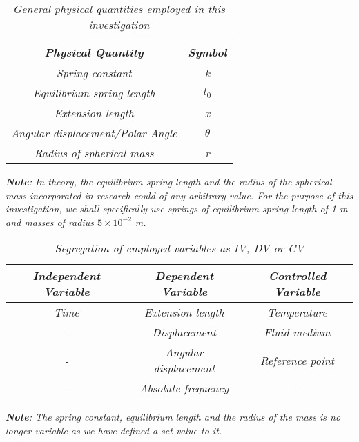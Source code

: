 \begin{table}[H]
    \centering
        \begin{tabular}{|c|c|}
        \hline
        \hline
        \textit{Physical Quantity} & \textit{Symbol} \\
        \hline
        \hline
        \textit{Spring constant} & \textit{k} \\
        \hline
        \textit{Equilibrium spring length} & \textit{$l_0$} \\
        \hline
        \textit{Extension length} & \textit{x} \\
        \hline
        \textit{Angular displacement/Polar Angle} & \textit{$\theta$} \\
        \hline
        \textit{Radius of spherical mass} & \textit{r} \\
        \hline
        \hline
        \end{tabular}
    \caption{\textit{General physical quantities employed in this investigation}}
\end{table}

\textit{\textbf{Note}: In theory, the equilibrium spring length and the radius of the spherical mass incorporated in research could of any arbitrary value. For the purpose of this investigation, we shall specifically use springs of equilibrium spring length of 1 m and masses of radius $5\times10^{-2}$ m.}

\begin{table}[H]
    \centering
        \begin{tabular}{|c|c|c|}
        \hline
        \hline
        \textit{Independent Variable} & \textit{Dependent Variable} & \textit{Controlled Variable} \\
        \hline
        \hline
        \textit{Time} & \textit{Extension length} & \textit{Temperature} \\
        \hline
        \textit{-} & \textit{Displacement} & \textit{Fluid medium} \\
        \hline
        \textit{-} & \textit{Angular displacement} & \textit{Reference point} \\
        \hline
        \textit{-} & \textit{Absolute frequency} & \textit{-} \\
        \hline
        \hline
        \end{tabular}
    \caption{\textit{Segregation of employed variables as IV, DV or CV}}
\end{table}

\textit{\textbf{Note}: The spring constant, equilibrium length and the radius of the mass is no longer variable as we have defined a set value to it.}

